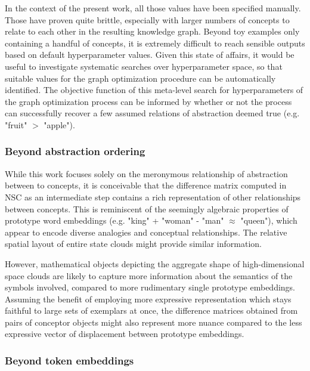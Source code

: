 In the context of the present work, all those values have been specified manually. Those have proven quite brittle, especially with larger numbers of concepts to relate to each other in the resulting knowledge graph. Beyond toy examples only containing a handful of concepts, it is extremely difficult to reach sensible outputs based on default hyperparameter values. Given this state of affairs, it would be useful to investigate systematic searches over hyperparameter space, so that suitable values for the graph optimization procedure can be automatically identified. The objective function of this meta-level search for hyperparameters of the graph optimization process can be informed by whether or not the process can successfully recover a few assumed relations of abstraction deemed true (e.g. "fruit" $>$ "apple").

\subsubsection{Beyond abstraction ordering}

While this work focuses solely on the meronymous relationship of abstraction between to concepts, it is conceivable that the difference matrix computed in NSC as an intermediate step contains a rich representation of other relationships between concepts. This is reminiscent of the seemingly algebraic properties of prototype word embeddings (e.g. "king" + "woman" - "man" $\approx$ "queen"), which appear to encode diverse analogies and conceptual relationships. The relative spatial layout of entire state clouds might provide similar information.

However, mathematical objects depicting the aggregate shape of high-dimensional space clouds are likely to capture more information about the semantics of the symbols involved, compared to more rudimentary single prototype embeddings. Assuming the benefit of employing more expressive representation which stays faithful to large sets of exemplars at once, the difference matrices obtained from pairs of conceptor objects might also represent more nuance compared to the less expressive vector of displacement between prototype embeddings.

\subsubsection{Beyond token embeddings}

